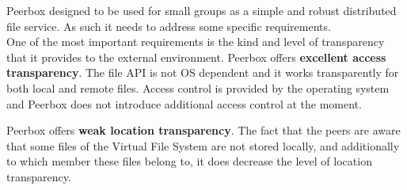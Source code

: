 
Peerbox designed to be used for small groups as a simple and robust distributed file service. As such it needs to address some specific requirements.\\

One of the most important requirements is the kind and level of transparency that it provides to the external environment. Peerbox offers \textbf{excellent access transparency}. The file API is not OS dependent and it works transparently for both local and remote files. Access control is provided by the operating system and Peerbox does not introduce additional access control at the moment.

Peerbox offers \textbf{weak location transparency}. The fact that the peers are aware that some files of the Virtual File System are not stored locally, and additionally to which member these files belong to, it does decrease the level of location transparency.



%





 
 






% 





